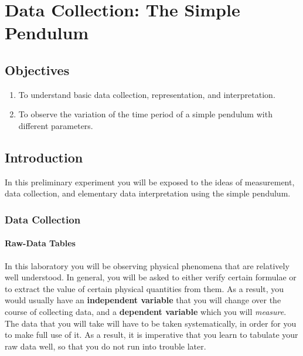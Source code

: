 
\chapter{Data Collection: The Simple Pendulum}

\section{Objectives}

\begin{enumerate}
    \item To understand basic data collection, representation, and interpretation.
    \item To observe the variation of the time period of a simple pendulum with different parameters.
\end{enumerate}

\section{Introduction}

In this preliminary experiment you will be exposed to the ideas of measurement, data collection, and elementary data interpretation using the simple pendulum. 

\subsection{Data Collection}

\subsubsection{Raw-Data Tables}

In this laboratory you will be observing physical phenomena that are relatively well understood. In general, you will be asked to either verify certain formulae or to extract the value of certain physical quantities from them. As a result, you would usually have an \textbf{independent variable} that you will change over the course of collecting data, and a \textbf{dependent variable} which you will \textit{measure}. The data that you will take will have to be taken systematically, in order for you to make full use of it. As a result, it is imperative that you learn to tabulate your raw data well, so that you do not run into trouble later.

